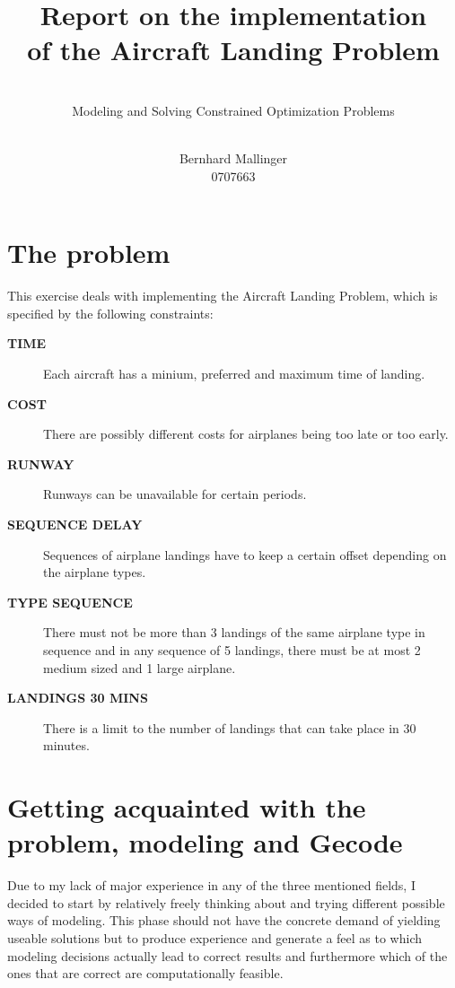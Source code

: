 \documentclass[,%
			paper=a4,%
			DIV12,
			liststotoc,
			bibtotoc,
			draft=false,%
			numbers=noendperiod
			]{scrartcl}
\title{Report on the implementation\\of the Aircraft Landing Problem}
\subtitle{\hfill \\ Modeling and Solving Constrained Optimization Problems}
\author{\hfill \\ Bernhard Mallinger \\ 0707663}
\begin{document}
\maketitle

\section{The problem}

This exercise deals with implementing the Aircraft Landing Problem, which is specified by the following constraints:

\newcommand{\constr}[1]{\textbf{\textsf{#1}}}
\newcommand{\Ctime}{\constr{TIME}}
\newcommand{\Ccost}{\constr{COST}}
\newcommand{\Crunway}{\constr{RUNWAY}}
\newcommand{\CseqDel}{\constr{SEQUENCE DELAY}}
\newcommand{\CtypeSeq}{\constr{TYPE SEQUENCE}}
\newcommand{\Clandings}{\constr{LANDINGS 30 MINS}}
\begin{description}
	\item[\Ctime] Each aircraft has a minium, preferred and maximum time of landing.
	\item[\Ccost] There are possibly different costs for airplanes being too late or too early.
	\item[\Crunway] Runways can be unavailable for certain periods.
	\item[\CseqDel] Sequences of airplane landings have to keep a certain offset depending on the airplane types.
	\item[\CtypeSeq] There must not be more than 3 landings of the same airplane type in sequence and in any sequence of 5 landings, there must be at most 2 medium sized and 1 large airplane.
	\item[\Clandings] There is a limit to the number of landings that can take place in 30 minutes.

\end{description}

\section{Getting acquainted with the problem, modeling and Gecode}

Due to my lack of major experience in any of the three mentioned fields, I decided to start by relatively freely thinking about and trying different possible ways of modeling.
This phase should not have the concrete demand of yielding useable solutions but to produce experience and generate a feel as to which modeling decisions actually lead to correct results and furthermore which of the ones that are correct are computationally feasible.
\end{document}
